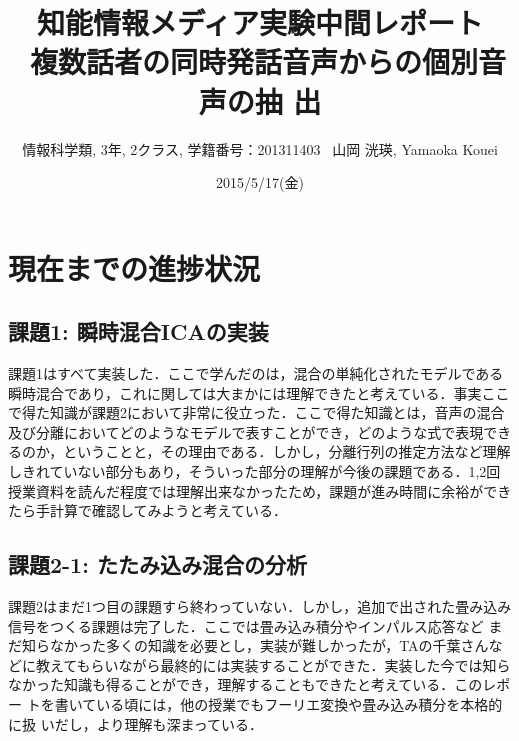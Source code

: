 \documentclass[a4j]{jarticle}
\title{知能情報メディア実験中間レポート \\ \ 複数話者の同時発話音声からの個別音声の抽
出}
\author{情報科学類, 3年, 2クラス, 学籍番号：201311403 \ 山岡 洸瑛, Yamaoka
Kouei}
\date{2015/5/17(金)}
\begin{document}
 \maketitle
\section*{現在までの進捗状況}
\subsection*{課題1: 瞬時混合ICAの実装}
課題1はすべて実装した．ここで学んだのは，混合の単純化されたモデルである
瞬時混合であり，これに関しては大まかには理解できたと考えている．事実ここ
で得た知識が課題2において非常に役立った．ここで得た知識とは，音声の混合
及び分離においてどのようなモデルで表すことができ，どのような式で表現でき
るのか，ということと，その理由である．しかし，分離行列の推定方法など理解
しきれていない部分もあり，そういった部分の理解が今後の課題である．1,2回
授業資料を読んだ程度では理解出来なかったため，課題が進み時間に余裕ができ
たら手計算で確認してみようと考えている．

\subsection*{課題2-1: たたみ込み混合の分析}
課題2はまだ1つ目の課題すら終わっていない．しかし，追加で出された畳み込み
信号をつくる課題は完了した．ここでは畳み込み積分やインパルス応答など
まだ知らなかった多くの知識を必要とし，実装が難しかったが，TAの千葉さんな
どに教えてもらいながら最終的には実装することができた．実装した今では知ら
なかった知識も得ることができ，理解することもできたと考えている．このレポー
トを書いている頃には，他の授業でもフーリエ変換や畳み込み積分を本格的に扱
いだし，より理解も深まっている．
\end{document}
